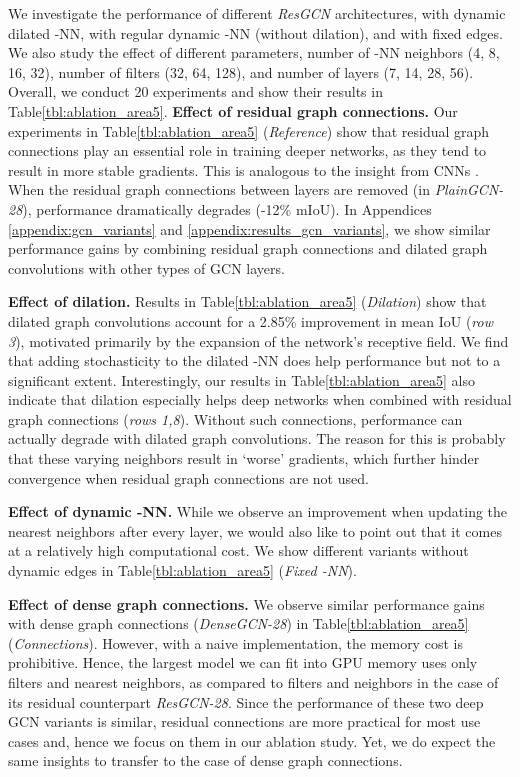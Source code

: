 \documentclass[10pt,twocolumn,letterpaper]{article}
\newcommand{\tblLabel}{Table\xspace}
\newcommand{\mysection}[1]{\vspace{3pt}\noindent\textbf{#1.}}
\begin{document}
We investigate the performance of different \emph{ResGCN} architectures, \eg with dynamic dilated -NN, with regular dynamic -NN (without dilation), and with fixed edges. We also study the effect of different parameters, \eg number of -NN neighbors (4, 8, 16, 32), number of filters (32, 64, 128), and number of layers (7, 14, 28, 56). 
Overall, we conduct 20 experiments and show their results in \tblLabel \ref{tbl:ablation_area5}. 
\mysection{Effect of residual graph connections}
Our experiments in \tblLabel \ref{tbl:ablation_area5} (\textit{Reference})
show that residual graph connections play an essential role in training deeper networks, as they tend to result in more stable gradients. This is analogous to the insight from CNNs \cite{he2016deep}. When the residual graph connections between layers are removed (\ie in \emph{PlainGCN-28}), performance dramatically degrades (-12\% mIoU). In Appendices \ref{appendix:gcn_variants} and \ref{appendix:results_gcn_variants}, we  show similar performance gains by combining residual graph connections and dilated graph convolutions with other types of GCN layers.

\mysection{Effect of dilation}
Results in \tblLabel \ref{tbl:ablation_area5} (\textit{Dilation}) \cite{yu2015multi} show that dilated graph convolutions account for a 2.85\% improvement in mean IoU (\textit{row 3}), 
motivated primarily by the expansion of the network's receptive field. 
We find that adding stochasticity to the dilated -NN does help performance but not to a significant extent. Interestingly, our results in \tblLabel \ref{tbl:ablation_area5} also indicate that dilation especially helps deep networks when combined with residual graph connections (\textit{rows 1,8}). Without such connections, performance can actually degrade with dilated graph convolutions. The reason for this is probably that these varying neighbors result in `worse' gradients, which further hinder convergence when residual graph connections are not used.

\mysection{Effect of dynamic -NN}
While we observe an improvement when updating the  nearest neighbors after every layer, we would also like to point out that it comes at a relatively high computational cost. We show different variants without dynamic edges in \tblLabel \ref{tbl:ablation_area5} (\textit{Fixed -NN}).

\mysection{Effect of dense graph connections}
We observe similar performance gains with dense graph connections (\emph{DenseGCN-28}) in \tblLabel \ref{tbl:ablation_area5} (\textit{Connections}). However, with a naive implementation, the memory cost is prohibitive. Hence, the largest model we can fit into GPU memory uses only  filters and  nearest neighbors, as compared to  filters and  neighbors in the case of its residual counterpart \emph{ResGCN-28}. Since the performance of these two deep GCN variants is similar, residual connections are more practical for most use cases and, hence we focus on them in our ablation study. Yet, we do expect the same insights to transfer to the case of dense graph connections.
\end{document}
